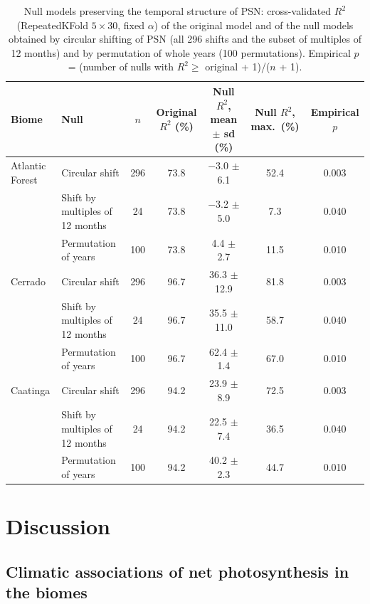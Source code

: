 \documentclass[a4paper,fleqn]{cas-dc}
\begin{document}
\begin{table}[htbp]
\caption{Null models preserving the temporal structure of PSN: cross-validated $R^2$ (RepeatedKFold $5 \times 30$, fixed $\alpha$) of the original model and of the null models obtained by circular shifting of PSN (all 296 shifts and the subset of multiples of 12 months) and by permutation of whole years (100 permutations). Empirical $p$ = (number of nulls with $R^2 \ge$ original + 1)/($n$ + 1).}\label{tbl:nulls}
\footnotesize
\begin{tabular*}{\tblwidth}{@{}LLCCCCC@{}}
\toprule
Biome & Null & $n$ & Original $R^2$ (\%) & Null $R^2$, mean $\pm$ sd (\%) & Null $R^2$, max.\ (\%) & Empirical $p$ \\
\midrule
Atlantic Forest & Circular shift & 296 & 73.8 & $-$3.0 $\pm$ 6.1 & 52.4 & 0.003 \\
 & Shift by multiples of 12 months & 24 & 73.8 & $-$3.2 $\pm$ 5.0 & 7.3 & 0.040 \\
 & Permutation of years & 100 & 73.8 & 4.4 $\pm$ 2.7 & 11.5 & 0.010 \\
Cerrado & Circular shift & 296 & 96.7 & 36.3 $\pm$ 12.9 & 81.8 & 0.003 \\
 & Shift by multiples of 12 months & 24 & 96.7 & 35.5 $\pm$ 11.0 & 58.7 & 0.040 \\
 & Permutation of years & 100 & 96.7 & 62.4 $\pm$ 1.4 & 67.0 & 0.010 \\
Caatinga & Circular shift & 296 & 94.2 & 23.9 $\pm$ 8.9 & 72.5 & 0.003 \\
 & Shift by multiples of 12 months & 24 & 94.2 & 22.5 $\pm$ 7.4 & 36.5 & 0.040 \\
 & Permutation of years & 100 & 94.2 & 40.2 $\pm$ 2.3 & 44.7 & 0.010 \\
\bottomrule
\end{tabular*}
\end{table}

\section{Discussion}\label{sec:discussion}

\subsection{Climatic associations of net photosynthesis in the biomes}
\end{document}
